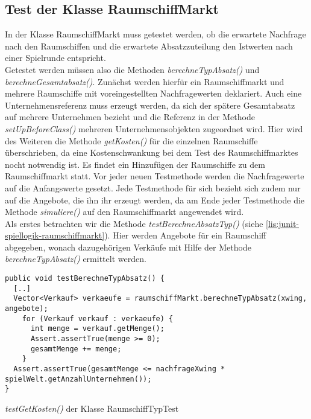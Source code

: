 \subsection{Test der Klasse RaumschiffMarkt}
\label{sub:junit-spiellogik-raumschiffmarkt}  

In der Klasse RaumschiffMarkt muss getestet werden, ob die erwartete Nachfrage nach den Raumschiffen und die erwartete Absatzzuteilung den Istwerten nach einer Spielrunde entspricht.
\\
Getestet werden müssen also die Methoden \textit{berechneTypAbsatz()} und \textit{berechneGesamtabsatz()}. Zunächst werden hierfür ein Raumschiffmarkt und mehrere Raumschiffe mit voreingestellten Nachfragewerten deklariert. Auch eine Unternehmensreferenz muss erzeugt werden, da sich der spätere Gesamtabsatz auf mehrere Unternehmen bezieht und die Referenz in der Methode \textit{setUpBeforeClass()} mehreren Unternehmensobjekten zugeordnet wird. Hier wird des Weiteren die Methode \textit{getKosten()} für die einzelnen Raumschiffe überschrieben, da eine Kostenschwankung bei dem Test des Raumschiffmarktes nocht notwendig ist. Es findet ein Hinzufügen der Raumschiffe zu dem Raumschiffmarkt statt. Vor jeder neuen Testmethode werden die Nachfragewerte auf die Anfangswerte gesetzt. Jede Testmethode für sich bezieht sich zudem nur auf die Angebote, die ihn ihr erzeugt werden, da am Ende jeder Testmethode die Methode \textit{simuliere()} auf den Raumschiffmarkt angewendet wird.
\\
Als erstes betrachten wir die Methode \textit{testBerechneAbsatzTyp()} (siehe \ref{lis:junit-spiellogik-raumschiffmarkt}). Hier werden Angebote für ein Raumschiff abgegeben, wonach dazugehörigen Verkäufe mit Hilfe der Methode \textit{berechneTypAbsatz()} ermittelt werden.

\begin{programm}[htbp]
\begin{lstlisting}[breaklines=true]
public void testBerechneTypAbsatz() {
  [..]
  Vector<Verkauf> verkaeufe = raumschiffMarkt.berechneTypAbsatz(xwing, angebote);
    for (Verkauf verkauf : verkaeufe) {
	  int menge = verkauf.getMenge();
	  Assert.assertTrue(menge >= 0);
	  gesamtMenge += menge;
    }
  Assert.assertTrue(gesamtMenge <= nachfrageXwing * spielWelt.getAnzahlUnternehmen());
}
\end{lstlisting}
\caption{\textit{testGetKosten()} der Klasse RaumschiffTypTest\label{lis:junit-spiellogik-raumschiffmarkt}}
\end{programm}

